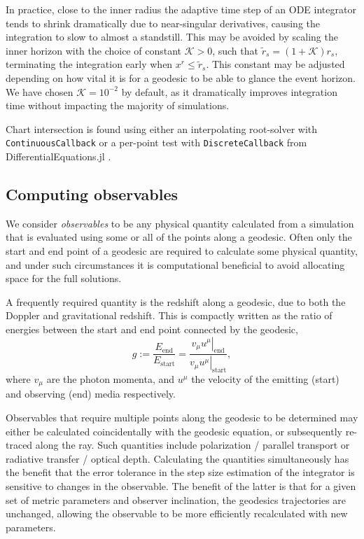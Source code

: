 In practice, close to the inner radius the adaptive time step of an ODE integrator tends to shrink dramatically due to near-singular derivatives, causing the integration to slow to almost a standstill. This may be avoided by scaling the inner horizon with the choice of constant $\mathcal{K} > 0$, such that $\tilde{r}_s = (1 + \mathcal{K}) r_s$, terminating the integration early when $x^r \leq \tilde{r}_s$. This constant may be adjusted depending on how vital it is for a geodesic to be able to glance the event horizon. We have chosen $\mathcal{K} = 10^{-2}$ by default, as it dramatically improves integration time without impacting the majority of simulations. 

Chart intersection is found using either an interpolating root-solver with \texttt{ContinuousCallback} or a per-point test with \texttt{DiscreteCallback} from DifferentialEquations.jl \citep{}.


\subsection{Computing observables}

We consider \textit{observables} to be any physical quantity calculated from a simulation that is evaluated using some or all of the points along a geodesic. Often only the start and end point of a geodesic are required to calculate some physical quantity, and under such circumstances it is computational beneficial to avoid allocating space for the full solutions.

A frequently required quantity is the redshift along a geodesic, due to both the Doppler and gravitational redshift. This is compactly written as the ratio of energies between the start and end point connected by the geodesic,
\begin{equation}
\label{eq:redshift}
g := \frac{E_\text{end}}{E_\text{start}} = \frac{\left. v_\mu u^\mu \right\rvert_\text{end}}{\left. v_\mu u^\mu \right\rvert_{\text{start}}},
\end{equation}
where $v_\mu$ are the photon momenta, and $u^\mu$ the velocity of the emitting (start) and observing (end) media respectively.

Observables that require multiple points along the geodesic to be determined may either be calculated coincidentally with the geodesic equation, or subsequently re-traced along the ray. Such quantities include polarization / parallel transport or radiative transfer / optical depth. Calculating the quantities simultaneously has the benefit that the error tolerance in the step size estimation of the integrator is sensitive to changes in the observable. The benefit of the latter is that for a given set of metric parameters and observer inclination, the geodesics trajectories are unchanged, allowing the observable to be more efficiently recalculated with new parameters.

